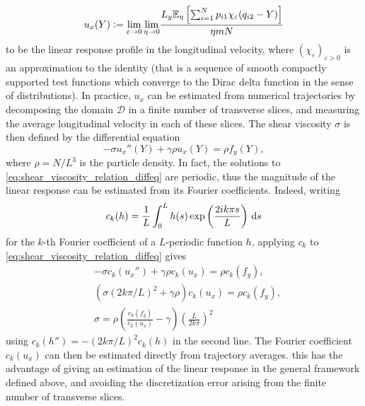 \begin{equation}
    \label{eq:velocity_profile}
    u_x(Y)\mathrel{\mathop:}= \underset{\varepsilon \to 0}{\lim} \, \underset{\eta \to 0}{\lim} \frac{L_y\mathbb{E}_\eta \left[\sum_{i=1}^N p_{i1}\chi_\varepsilon(q_{i2}-Y)\right]}{\eta mN}
\end{equation}
to be the linear response profile in the longitudinal velocity, where $(\chi_\varepsilon)_{\varepsilon>0}$ is an approximation to the identity (that is a sequence of smooth compactly supported test functions which converge to the Dirac delta function in the sense of distributions).
In practice, $u_x$ can be estimated from numerical trajectories by decomposing the domain $\mathcal D$ in a finite number of transverse slices,
 and measuring the average longitudinal velocity in each of these slices.
 The shear viscosity $\sigma$ is then defined by the differential equation
\begin{equation}
    \label{eq:shear_viscosity_relation_diffeq}
    -\sigma u_x''(Y)+\gamma \rho u_x(Y)=\rho f_y(Y),
\end{equation}
where $\rho= N/L^3$ is the particle density.
In fact, the solutions to \eqref{eq:shear_viscosity_relation_diffeq} are periodic, thus the magnitude of the linear response can be estimated from its Fourier coefficients.
Indeed, writing
\begin{equation}
    \label{eq:fourier_coefficient}
    c_k(h)=\frac{1}{L}\int_0^L h(s)\exp\left(\frac{2ik\pi s}{L}\right)\,\mathrm{d} s
\end{equation}
for the $k$-th Fourier coefficient of a $L$-periodic function $h$, applying $c_k$ to \eqref{eq:shear_viscosity_relation_diffeq} gives
\begin{equation}
    \label{eq:fourier_relation_sv}
    \begin{aligned}
        &-\sigma c_k(u_x'')+\gamma\rho c_k(u_x)=\rho c_k(f_y),\\
        &(\sigma \left(2k\pi/L\right)^2 +\gamma \rho)c_k(u_x)=\rho c_k(f_y),\\
        &\sigma =\rho\left(\frac{c_k(f_y)}{c_k(u_x)}-\gamma\right)\left(\frac{L}{2k\pi}\right)^2
    \end{aligned}
\end{equation}
using $c_k(h'')=-\left(2k\pi/L\right)^2 c_k(h)$ in the second line.
The Fourier coefficient $c_k(u_x)$ can then be estimated directly from trajectory averages. this has the advantage of giving an estimation of the linear response in the general framework defined above, and avoiding the discretization error arising from the finite number of transverse slices.
